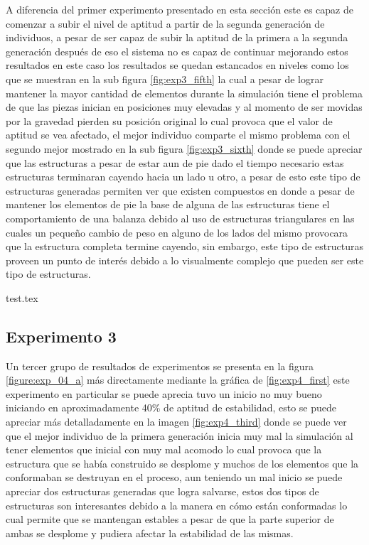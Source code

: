A diferencia del primer experimento presentado en esta sección este es capaz de
comenzar a subir el nivel de aptitud a partir de la segunda generación de
individuos, a pesar de ser capaz de subir la aptitud de la primera a la segunda
generación después de eso el sistema no es capaz de continuar mejorando estos
resultados en este caso los resultados se quedan estancados en niveles como los
que se muestran en la sub figura \ref{fig:exp3_fifth} la cual a pesar de lograr
mantener la mayor cantidad de elementos durante la simulación tiene el problema
de que las piezas inician en posiciones muy elevadas y al momento de ser movidas
por la gravedad pierden su posición original lo cual provoca que el valor de
aptitud se vea afectado, el mejor individuo comparte el mismo problema con el
segundo mejor mostrado en la sub figura \ref{fig:exp3_sixth} donde se puede
apreciar que las estructuras a pesar de estar aun de pie dado el tiempo
necesario estas estructuras terminaran cayendo hacia un lado u otro, a pesar de
esto este tipo de estructuras generadas permiten ver que existen compuestos en
donde a pesar de mantener los elementos de pie la base de alguna de las
estructuras tiene el comportamiento de una balanza debido al uso de estructuras
triangulares en las cuales un pequeño cambio de peso en alguno de los lados del
mismo provocara que la estructura completa termine cayendo, sin embargo, este
tipo de estructuras proveen un punto de interés debido a lo visualmente
complejo que pueden ser este tipo de estructuras.

{test.tex}

\newpage

\subsection{Experimento 3}
\label{chap6:exp_3}

Un tercer grupo de resultados de experimentos se presenta en la figura
\ref{figure:exp_04_a} más directamente mediante la gráfica de
\ref{fig:exp4_first} este experimento en particular se puede aprecia tuvo un
inicio no muy bueno iniciando en aproximadamente 40\% de aptitud de estabilidad,
esto se puede apreciar más detalladamente en la imagen \ref{fig:exp4_third}
donde se puede ver que el mejor individuo de la primera generación inicia muy
mal la simulación al tener elementos que inicial con muy mal acomodo lo cual
provoca que la estructura que se había construido se desplome y muchos de los
elementos que la conformaban se destruyan en el proceso, aun teniendo un mal
inicio se puede apreciar dos estructuras generadas que logra salvarse, estos dos
tipos de estructuras son interesantes debido a la manera en cómo están
conformadas lo cual permite que se mantengan estables a pesar de que la parte
superior de ambas se desplome y pudiera afectar la estabilidad de las mismas. 

